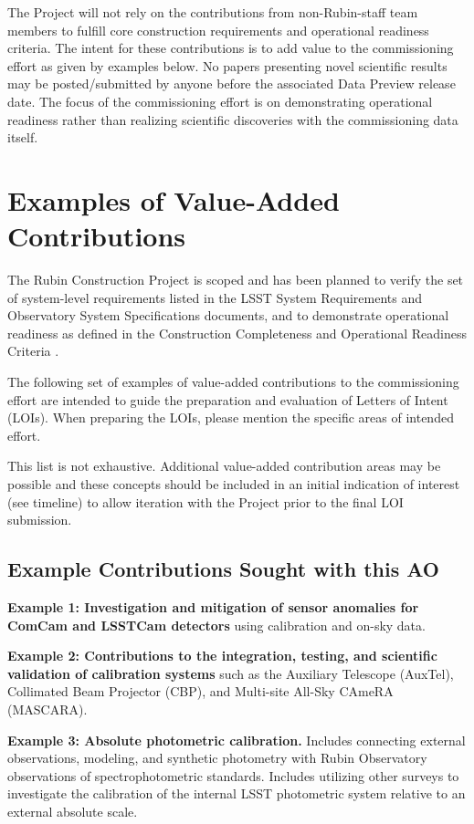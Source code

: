 \documentclass[SE,authoryear,toc]{lsstdoc}
\begin{document}
The Project will not rely on the contributions from non-Rubin-staff team members to fulfill core construction requirements and operational readiness criteria. The intent for these contributions is to add value to the commissioning effort as given by examples below.  No papers presenting novel scientific results may be posted/submitted by anyone before the associated Data Preview release date. The focus of the commissioning effort is on demonstrating operational readiness rather than realizing scientific discoveries with the commissioning data itself.

\section{Examples of Value-Added Contributions}
\label{examples}

The Rubin Construction Project is scoped and has been planned to verify the set of system-level requirements listed in the LSST System Requirements  and Observatory System Specifications  documents, and to demonstrate operational readiness as defined in the Construction Completeness and Operational Readiness Criteria . 

The following set of examples of value-added contributions to the commissioning effort are intended to guide the preparation and evaluation of Letters of Intent (LOIs). When preparing the LOIs, please mention the specific areas of intended effort. 

This list is not exhaustive. Additional value-added contribution areas may be possible and these concepts should be included in an initial indication of interest (see timeline) to allow iteration with the Project prior to the final LOI submission.

\subsection{Example Contributions Sought with this AO}

\textbf{Example 1: Investigation and mitigation of sensor anomalies for ComCam and LSSTCam detectors} using calibration and on-sky data.

\textbf{Example 2: Contributions to the integration, testing, and scientific validation of calibration systems} such as the Auxiliary Telescope (AuxTel), Collimated Beam Projector (CBP), and Multi-site All-Sky CAmeRA (MASCARA).

\textbf{Example 3: Absolute photometric calibration.} Includes connecting external observations, modeling, and synthetic photometry with Rubin Observatory observations of  spectrophotometric standards. Includes utilizing other surveys to investigate the calibration of the internal LSST photometric system relative to an external absolute scale.
\end{document}
